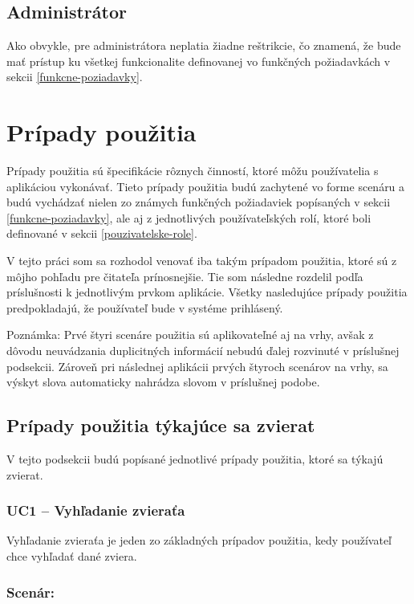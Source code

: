 \subsection{Administrátor}\label{administrator}
Ako obvykle, pre administrátora neplatia žiadne reštrikcie, čo znamená, že bude mať prístup ku všetkej funkcionalite definovanej vo funkčných požiadavkách v sekcii \ref{funkcne-poziadavky}.

\section{Prípady použitia}\label{pripady-pouzitia}
Prípady použitia sú špecifikácie rôznych činností, ktoré môžu používatelia s aplikáciou vykonávať\cite{co-su-pripady-pouzitia}. Tieto prípady použitia budú zachytené vo forme scenáru a budú vychádzať nielen zo známych funkčných požiadaviek popísaných v sekcii \ref{funkcne-poziadavky}, ale aj z jednotlivých používateľských rolí, ktoré boli definované v sekcii \ref{pouzivatelske-role}.

V tejto práci som sa rozhodol venovať iba takým prípadom použitia, ktoré sú z môjho pohľadu pre čitateľa prínosnejšie. Tie som následne rozdelil podľa príslušnosti k jednotlivým prvkom aplikácie. Všetky nasledujúce prípady použitia predpokladajú, že používateľ bude v systéme prihlásený.

\hfill \break
Poznámka: Prvé štyri scenáre použitia sú aplikovateľné aj na vrhy, avšak z dôvodu neuvádzania duplicitných informácií nebudú ďalej rozvinuté v príslušnej podsekcii. Zároveň pri následnej aplikácii prvých štyroch scenárov na vrhy, sa výskyt slova  automaticky nahrádza slovom  v príslušnej podobe.

\subsection{Prípady použitia týkajúce sa zvierat}
V tejto podsekcii budú popísané jednotlivé prípady použitia, ktoré sa týkajú zvierat.

\subsubsection*{UC1 -- Vyhľadanie zvieraťa}\label{uc1}

Vyhľadanie zvieraťa je jeden zo základných prípadov použitia, kedy používateľ chce vyhľadať dané zviera.

\subsubsection*{Scenár:}

